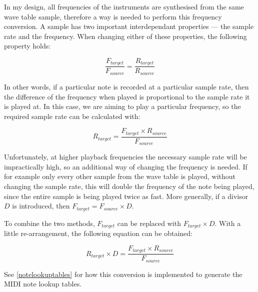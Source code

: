In my design, all frequencies of the instruments are synthesised from the same wave table sample, 
therefore a way is needed to perform this frequency conversion.  A sample has two important 
interdependant properties --- the sample rate and the frequency.  When changing either of these 
properties, the following property holds:

\[\frac{F_{target}}{F_{source}} = \frac{R_{target}}{R_{source}}\]

In other words, if a particular note is recorded at a particular sample rate, then the difference of 
the frequency when played is proportional to the sample rate it is played at.  In this case, we are 
aiming to play a particular frequency, so the required sample rate can be calculated with:

\[R_{target} = \frac{F_{target} \times R_{source}}{F_{source}}\]

Unfortunately, at higher playback frequencies the necessary sample rate will be impractically high, 
so an additional way of changing the frequency is needed.  If for example only every other sample 
from the wave table is played, without changing the sample rate, this will double the frequency of 
the note being played, since the entire sample is being played twice as fast.  More generally, if a 
divisor $D$ is introduced, then $F_{target} = F_{source} \times D$.

To combine the two methods, $F_{target}$ can be replaced with $F_{target} \times D$.  With a little 
re-arrangement, the following equation can be obtained:

\[R_{target} \times D = \frac{F_{target} \times R_{source}}{F_{source}}\]

See \ref{notelookuptables} for how this conversion is implemented to generate the MIDI note lookup 
tables.
